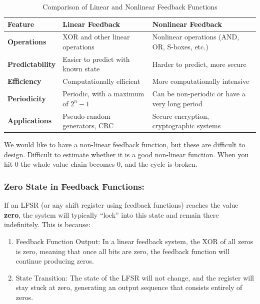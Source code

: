 \begin{table}[h!]
    \centering
    \renewcommand{\arraystretch}{1.2} %
    \begin{tabular}{|>{\raggedright\arraybackslash}m{4cm}|>{\raggedright\arraybackslash}m{5cm}|>{\raggedright\arraybackslash}m{5cm}|}
    \hline
    \textbf{Feature} & \textbf{Linear Feedback} & \textbf{Nonlinear Feedback} \\
    \hline
    \textbf{Operations} & XOR and other linear operations & Nonlinear operations (AND, OR, S-boxes, etc.) \\
    \hline
    \textbf{Predictability} & Easier to predict with known state & Harder to predict, more secure \\
    \hline
    \textbf{Efficiency} & Computationally efficient & More computationally intensive \\
    \hline
    \textbf{Periodicity} & Periodic, with a maximum of $2^n - 1$ & Can be non-periodic or have a very long period \\
    \hline
    \textbf{Applications} & Pseudo-random generators, CRC & Secure encryption, cryptographic systems \\
    \hline
    \end{tabular}
    \caption{Comparison of Linear and Nonlinear Feedback Functions}
    \label{tab:feedback_comparison}
\end{table}

We would like to have a non-linear feedback function, but these are difficult to design. Difficult to estimate whether it is a good non-linear function. When you hit 0 the whole value chain becomes 0, and the cycle is broken. \\

\subsubsection{Zero State in Feedback Functions:}
If an LFSR (or any shift register using feedback functions) reaches the value \textbf{zero}, the system will typically ``lock'' into this state and remain there indefinitely. This is because:

\begin{enumerate}
    \item Feedback Function Output: In a linear feedback system, the XOR of all zeros is zero, meaning that once all bits are zero, the feedback function will continue producing zeros.
    \item State Transition: The state of the LFSR will not change, and the register will stay stuck at zero, generating an output sequence that consists entirely of zeros.
\end{enumerate}

